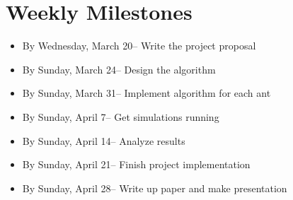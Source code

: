 \documentclass[12pt]{article}
\newcommand{\Comments}{1}
\newcommand{\mynote}[2]{\ifnum\Comments=1\textcolor{#1}{#2}\fi}
\newcommand{\jessie}[1]{\mynote{blue}{[JF: #1]}}
\begin{document}
%
%
%


\section{Weekly Milestones}
\begin{itemize}
\item By Wednesday, March 20-- Write the project proposal
\item By Sunday, March 24-- Design the algorithm
\item By Sunday, March 31-- Implement algorithm for each ant
\item By Sunday, April 7-- Get simulations running
\item By Sunday, April 14-- Analyze results
\item By Sunday, April 21-- Finish project implementation
\item By Sunday, April 28-- Write up paper and make presentation
\end{itemize}
\end{document}

